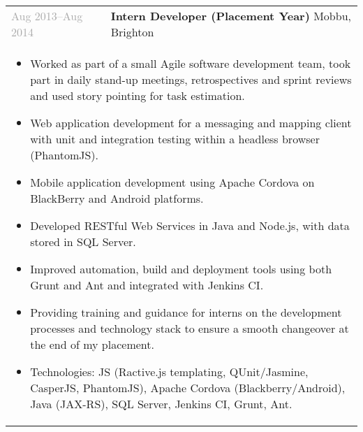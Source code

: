 \documentclass{article}
\newenvironment{exptable}{
  \begin{longtable}{lp{0.8\textwidth}}
  }{
  \end{longtable}
}
\begin{document}
\begin{exptable}
      \textcolor{darkgray}{Aug 2013--Aug 2014} & \textbf{Intern Developer (Placement Year)} Mobbu, Brighton \\
      \multicolumn{2}{p{\textwidth}}{
        \begin{itemize}
          \item Worked as part of a small Agile software development team, took part in daily stand-up meetings, retrospectives and sprint reviews and used story pointing for task estimation.
          \item Web application development for a messaging and mapping client with unit and integration testing within a headless browser (PhantomJS).
          \item Mobile application development using Apache Cordova on BlackBerry and Android platforms.
          \item Developed RESTful Web Services in Java and Node.js, with data stored in SQL Server.
          \item Improved automation, build and deployment tools using both Grunt and Ant and integrated with Jenkins CI.
          \item Providing training and guidance for interns on the development processes and technology stack to ensure a smooth changeover at the end of my placement.
        \end{itemize}

        \vspace{1em}

        \begin{itemize}[leftmargin=1em]
          \item[] Technologies: JS (Ractive.js templating, QUnit/Jasmine, CasperJS, PhantomJS), Apache Cordova (Blackberry/Android), Java (JAX-RS), SQL Server, Jenkins CI, Grunt, Ant.
        \end{itemize}
      } \\
    \end{exptable}

  \vspace{-1em}
\end{document}
